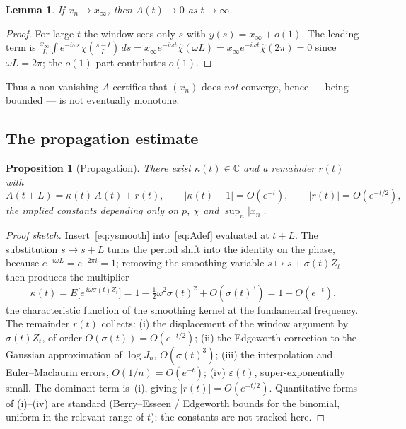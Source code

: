 \documentclass[11pt]{article}
\newtheorem{proposition}[theorem]{Proposition}
\newtheorem{lemma}[theorem]{Lemma}
\theoremstyle{definition}
\begin{document}
\begin{lemma}\label{lem:Aconv}
  If $x_n\to x_\infty$, then $A(t)\to0$ as $t\to\infty$.
\end{lemma}

\begin{proof}
  For large $t$ the window sees only $s$ with $y(s)=x_\infty+o(1)$.
  The leading term is
  $\frac{x_\infty}{L}\int e^{-i\omega s}\chi(\tfrac{s-t}L)\,ds
   =x_\infty e^{-i\omega t}\hat\chi(\omega L)
   =x_\infty e^{-i\omega t}\hat\chi(2\pi)=0$ since $\omega L=2\pi$;
  the $o(1)$ part contributes $o(1)$.
\end{proof}

Thus a non-vanishing $A$ certifies that $(x_n)$ does \emph{not}
converge, hence --- being bounded --- is not eventually monotone.

\subsection{The propagation estimate}

\begin{proposition}[Propagation]\label{prop:prop}
  There exist $\kappa(t)\in\mathbb C$ and a remainder $r(t)$ with
  \begin{equation}\label{eq:prop}
    A(t+L)=\kappa(t)\,A(t)+r(t),
    \qquad |\kappa(t)-1|=O(e^{-t}),\qquad |r(t)|=O(e^{-t/2}),
  \end{equation}
  the implied constants depending only on $p$, $\chi$ and
  $\sup_n|x_n|$.
\end{proposition}

\begin{proof}[Proof sketch]
  Insert~\eqref{eq:ysmooth} into~\eqref{eq:Adef} evaluated at $t+L$.
  The substitution $s\mapsto s+L$ turns the period shift into the
  identity on the phase, because $e^{-i\omega L}=e^{-2\pi i}=1$;
  removing the smoothing variable $s\mapsto s+\sigma(t)Z_t$ then
  produces the multiplier
  \[
    \kappa(t)=E\bigl[e^{\,i\omega\sigma(t)Z_t}\bigr]
            =1-\tfrac12\omega^2\sigma(t)^2+O(\sigma(t)^3)
            =1-O(e^{-t}),
  \]
  the characteristic function of the smoothing kernel at the
  fundamental frequency. The remainder $r(t)$ collects: (i) the
  displacement of the window argument by $\sigma(t)Z_t$, of order
  $O(\sigma(t))=O(e^{-t/2})$; (ii) the Edgeworth correction to the
  Gaussian approximation of $\log J_n$, $O(\sigma(t)^3)$; (iii) the
  interpolation and Euler--Maclaurin errors, $O(1/n)=O(e^{-t})$;
  (iv) $\varepsilon(t)$, super-exponentially small. The dominant term
  is~(i), giving $|r(t)|=O(e^{-t/2})$. Quantitative forms of
  (i)--(iv) are standard (Berry--Esseen / Edgeworth bounds for the
  binomial, uniform in the relevant range of $t$); the constants are
  not tracked here.
\end{proof}
\end{document}
